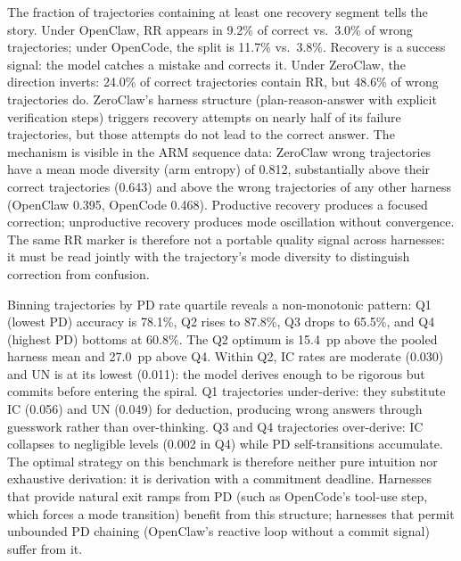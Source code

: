 
The fraction of trajectories containing at least one recovery segment tells the story. Under OpenClaw, RR appears in 9.2\% of correct vs.\ 3.0\% of wrong trajectories; under OpenCode, the split is 11.7\% vs.\ 3.8\%. Recovery is a success signal: the model catches a mistake and corrects it. Under ZeroClaw, the direction inverts: 24.0\% of correct trajectories contain RR, but 48.6\% of wrong trajectories do. ZeroClaw's harness structure (plan-reason-answer with explicit verification steps) triggers recovery attempts on nearly half of its failure trajectories, but those attempts do not lead to the correct answer. The mechanism is visible in the ARM sequence data: ZeroClaw wrong trajectories have a mean mode diversity (arm entropy) of 0.812, substantially above their correct trajectories (0.643) and above the wrong trajectories of any other harness (OpenClaw 0.395, OpenCode 0.468). Productive recovery produces a focused correction; unproductive recovery produces mode oscillation without convergence. The same RR marker is therefore not a portable quality signal across harnesses: it must be read jointly with the trajectory's mode diversity to distinguish correction from confusion.


Binning trajectories by PD rate quartile reveals a non-monotonic pattern: Q1 (lowest PD) accuracy is 78.1\%, Q2 rises to 87.8\%, Q3 drops to 65.5\%, and Q4 (highest PD) bottoms at 60.8\%. The Q2 optimum is 15.4~pp above the pooled harness mean and 27.0~pp above Q4. Within Q2, IC rates are moderate (0.030) and UN is at its lowest (0.011): the model derives enough to be rigorous but commits before entering the spiral. Q1 trajectories under-derive: they substitute IC (0.056) and UN (0.049) for deduction, producing wrong answers through guesswork rather than over-thinking. Q3 and Q4 trajectories over-derive: IC collapses to negligible levels (0.002 in Q4) while PD self-transitions accumulate. The optimal strategy on this benchmark is therefore neither pure intuition nor exhaustive derivation: it is derivation with a commitment deadline. Harnesses that provide natural exit ramps from PD (such as OpenCode's tool-use step, which forces a mode transition) benefit from this structure; harnesses that permit unbounded PD chaining (OpenClaw's reactive loop without a commit signal) suffer from it.

